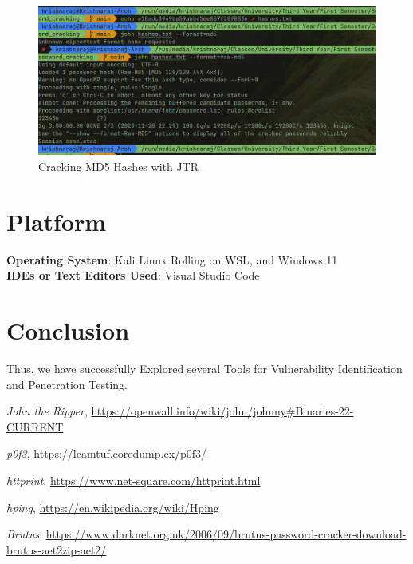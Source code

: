 \documentclass[11pt]{article}
\begin{document}
\begin{figure}[H]
    \centering
    \includegraphics[width=.95\textwidth]{john the ripper/md5hashcrack.png}
    \caption{Cracking MD5 Hashes with JTR}
\end{figure}

\section{Platform}
\textbf{Operating System}: Kali Linux Rolling on WSL, and Windows 11\\
\textbf{IDEs or Text Editors Used}: Visual Studio Code\\

\section{Conclusion}
Thus, we have successfully Explored several Tools for Vulnerability Identification and Penetration Testing.

\clearpage

\begin{thebibliography}{9}
     \emph{John the Ripper}, \url{https://openwall.info/wiki/john/johnny#Binaries-22-CURRENT}
    
     \emph{p0f3}, \url{https://lcamtuf.coredump.cx/p0f3/}
    
     \emph{httprint}, \url{https://www.net-square.com/httprint.html}
    
     \emph{hping}, \url{https://en.wikipedia.org/wiki/Hping}
    
     \emph{Brutus}, \url{https://www.darknet.org.uk/2006/09/brutus-password-cracker-download-brutus-aet2zip-aet2/}
\end{thebibliography}


\pagebreak
\end{document}
